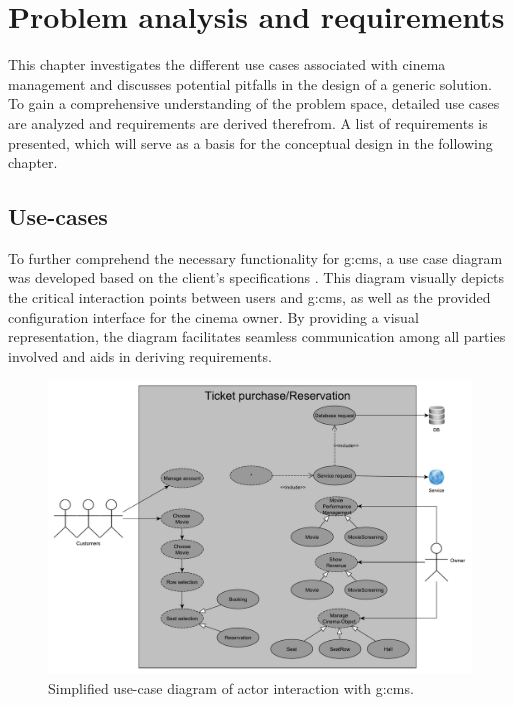 \chapter{Problem analysis and requirements}
\label{ch:problem-analysis}

This chapter investigates the different use cases associated with cinema management and discusses potential pitfalls in the design of a generic solution. To gain a comprehensive understanding of the problem space, detailed use cases are analyzed and requirements are derived therefrom. A list of requirements is presented, which will serve as a basis for the conceptual design in the following chapter.

\section{Use-cases}\label{sec:use-cases}

To further comprehend the necessary functionality for \gls{g:cms}, a use case diagram was developed based on the client's specifications \cite[1--2]{IIS2-ass}. This diagram visually depicts the critical interaction points between users and \gls{g:cms}, as well as the provided configuration interface for the cinema owner. By providing a visual representation, the diagram facilitates seamless communication among all parties involved and aids in deriving requirements.

\begin{figure}[H]
    \centering
    \includegraphics[width=\textwidth]{images/iis-use.case-new}
    \caption{Simplified use-case diagram of actor interaction with \gls{g:cms}.}
    \label{fig:use-cases}
\end{figure}

